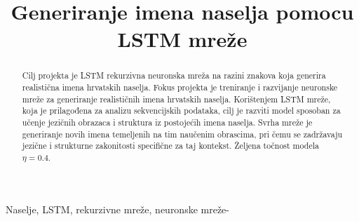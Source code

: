 \documentclass[conference]{IEEEtran}
\begin{document}
\title{Generiranje imena naselja pomocu LSTM mreže}


\author{
\and
{}
\and
{}
\and
{}
\and
{}
\and
{}
}

\maketitle

\begin{abstract}
Cilj projekta je LSTM rekurzivna neuronska mreža na razini znakova koja generira realistična imena hrvatskih naselja. Fokus projekta je treniranje i razvijanje neuronske mreže za generiranje realističnih imena hrvatskih naselja. Korištenjem LSTM mreže, koja je prilagođena za analizu sekvencijskih podataka, cilj je razviti model sposoban za učenje jezičnih obrazaca i struktura iz postojećih imena naselja. Svrha mreže je generiranje novih imena temeljenih na tim naučenim obrascima, pri čemu se zadržavaju jezične i strukturne zakonitosti specifične za taj kontekst.
Željena točnost modela $\eta = 0.4$.
\end{abstract}

\begin{IEEEkeywords}
Naselje, LSTM, rekurzivne mreže, neuronske mreže-
\end{IEEEkeywords}
\end{document}
